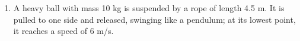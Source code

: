 \documentclass[12pt]{article}
\begin{document}
\Large
\centerline{}
\normalsize
\centerline{}

\begin{enumerate}

%
%
%
%
%
%
\item A heavy ball with mass 10 kg is suspended by a rope of length 4.5 m. It is pulled to one side and released, swinging like
a pendulum; at its lowest point, it reaches a speed of 6 m/s. 


\end{enumerate}
\end{document}
